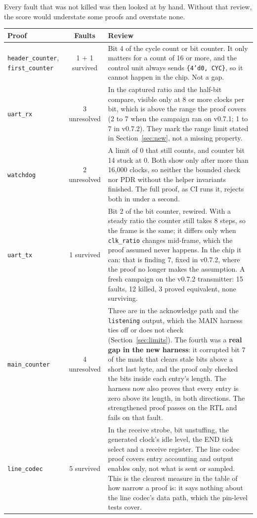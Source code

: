 \documentclass[11pt,a4paper]{article}
\newcommand{\sig}[1]{\texttt{#1}}
\begin{document}
Every fault that was not killed was then looked at by hand. Without that review, the score would understate some proofs and overstate none.

\begin{center}\small
\begin{tabularx}{\linewidth}{@{}l c L@{}}
\toprule
Proof & Faults & Review \\
\midrule
\sig{header\_counter}, \sig{first\_counter} & 1 + 1 survived & Bit 4 of the cycle count or bit counter. It only matters for a count of 16 or more, and the control unit always sends \sig{\{4'd0, CYC\}}, so it cannot happen in the chip. Not a gap. \\
\sig{uart\_rx} & 3 unresolved & In the captured ratio and the half-bit compare, visible only at 8 or more clocks per bit, which is above the range the proof covers (2 to 7 when the campaign ran on v0.7.1; 1 to 7 in v0.7.2). They mark the range limit stated in Section~\ref{sec:new}, not a missing property. \\
\sig{watchdog} & 2 unresolved & A limit of 0 that still counts, and counter bit 14 stuck at 0. Both show only after more than 16,000 clocks, so neither the bounded check nor PDR without the helper invariants finished. The full proof, as CI runs it, rejects both in under a second. \\
\sig{uart\_tx} & 1 survived & Bit 2 of the bit counter, rewired. With a steady ratio the counter still takes 8 steps, so the frame is the same; it differs only when \sig{clk\_ratio} changes mid-frame, which the proof assumed never happens. In the chip it can: that is finding 7, fixed in v0.7.2, where the proof no longer makes the assumption. A fresh campaign on the v0.7.2 transmitter: 15 faults, 12 killed, 3 proved equivalent, none surviving. \\
\sig{main\_counter} & 4 unresolved & Three are in the acknowledge path and the \sig{listening} output, which the MAIN harness ties off or does not check (Section~\ref{sec:limits}). The fourth was a \textbf{real gap in the new harness}: it corrupted bit 7 of the mask that clears stale bits above a short last byte, and the proof only checked the bits inside each entry's length. The harness now also proves that every entry is zero above its length, in both directions. The strengthened proof passes on the RTL and fails on that fault. \\
\sig{line\_codec} & 5 survived & In the receive strobe, bit unstuffing, the generated clock's idle level, the END tick select and a receive register. The line codec proof covers entry accounting and output enables only, not what is sent or sampled. This is the clearest measure in the table of how narrow a proof is: it says nothing about the line codec's data path, which the pin-level tests cover. \\
\bottomrule
\end{tabularx}
\end{center}
\end{document}
